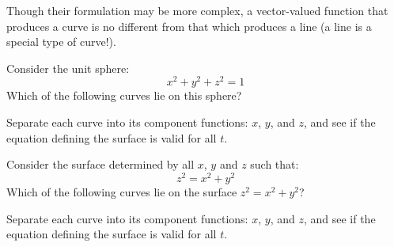\documentclass{ximera}
\begin{document}
Though their formulation may be more complex, a vector-valued function
that produces a curve is no different from that which produces a line
(a line is a special type of curve!).



\begin{question}
  Consider the unit sphere:
  \[
  x^2+y^2+z^2 = 1
  \]
  Which of the following curves lie on this sphere?
  \begin{hint}
    Separate each curve into its component functions: $x$, $y$, and
    $z$, and see if the equation defining the surface is valid for all
    $t$.
  \end{hint}
\end{question}




\begin{question}
  Consider the surface determined by all $x$, $y$ and $z$ such that:
  \[
  z^2=x^2+y^2
  \]
   Which of the following curves lie on the surface $z^2=x^2+y^2$?
  \begin{selectAll}
  \end{selectAll}
  \begin{hint}
    Separate each curve into its component functions: $x$, $y$, and
    $z$, and see if the equation defining the surface is valid for all
    $t$.
  \end{hint}
\end{question}
\end{document}
